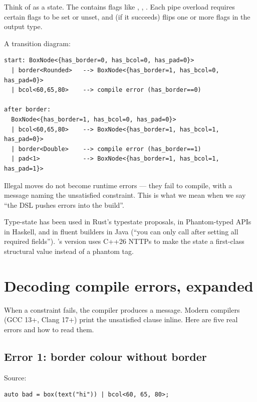Think of  as a state. The  contains
flags like , ,
. Each pipe overload requires certain
flags to be set or unset, and (if it succeeds) flips one or more
flags in the output type.

A transition diagram:

\begin{lstlisting}
start: BoxNode<{has_border=0, has_bcol=0, has_pad=0}>
  | border<Rounded>   --> BoxNode<{has_border=1, has_bcol=0, has_pad=0}>
  | bcol<60,65,80>    --> compile error (has_border==0)

after border:
  BoxNode<{has_border=1, has_bcol=0, has_pad=0}>
  | bcol<60,65,80>    --> BoxNode<{has_border=1, has_bcol=1, has_pad=0}>
  | border<Double>    --> compile error (has_border==1)
  | pad<1>            --> BoxNode<{has_border=1, has_bcol=1, has_pad=1}>
\end{lstlisting}

Illegal moves do not become runtime errors --- they fail to
compile, with a message naming the unsatisfied constraint. This
is what we mean when we say ``the DSL pushes errors into the
build''.

\begin{idea}
Type-state has been used in Rust's typestate proposals, in
Phantom-typed APIs in Haskell, and in fluent builders in Java
(``you can only call  after setting all required
fields''). \maya{}'s version uses C++26 NTTPs to make the state a
first-class structural value instead of a phantom tag.
\end{idea}

\section{Decoding compile errors, expanded}

When a constraint fails, the compiler produces a message. Modern
compilers (GCC 13+, Clang 17+) print the unsatisfied 
clause inline. Here are five real errors and how to read them.

\subsection*{Error 1: border colour without border}

Source:

\begin{lstlisting}
auto bad = box(text("hi")) | bcol<60, 65, 80>;
\end{lstlisting}

